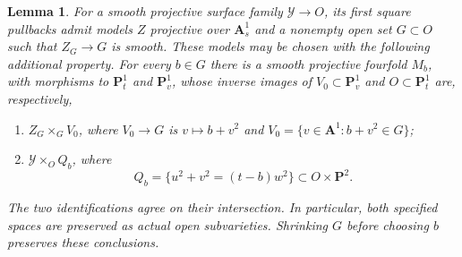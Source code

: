 \documentclass[11pt]{amsart}
\newcommand{\PP}{\mathbf P}
\renewcommand{\AA}{\mathbf A}
\newtheorem{lemma}[theorem]{Lemma}
\theoremstyle{definition}
\theoremstyle{remark}
\numberwithin{equation}{section}
\begin{document}
\begin{lemma}\label{comp:models}
For a smooth projective surface family $\mathcal Y\to O$, its first
square pullbacks admit models $Z$ projective over $\AA^1_s$ and a nonempty
open set $G\subset O$ such that $Z_G\to G$ is smooth.  These models may
be chosen with the following additional property.  For every $b\in G$
there is a smooth projective fourfold $M_b$, with morphisms to
$\PP^1_t$ and $\PP^1_v$, whose inverse images of $V_0\subset\PP^1_v$
and $O\subset\PP^1_t$ are, respectively,
\begin{enumerate}
\item $Z_G\times_GV_0$, where $V_0\to G$ is $v\mapsto b+v^2$ and
$V_0=\{v\in\AA^1:b+v^2\in G\}$;
\item $\mathcal Y\times_OQ_b$, where
\begin{equation}\label{comp:conic}
 Q_b=\{u^2+v^2=(t-b)w^2\}\subset O\times\PP^2.
\end{equation}
\end{enumerate}
The two identifications agree on their intersection.  In particular,
both specified spaces are preserved as actual open subvarieties.
Shrinking $G$ before choosing $b$ preserves these conclusions.
\end{lemma}
\end{document}
